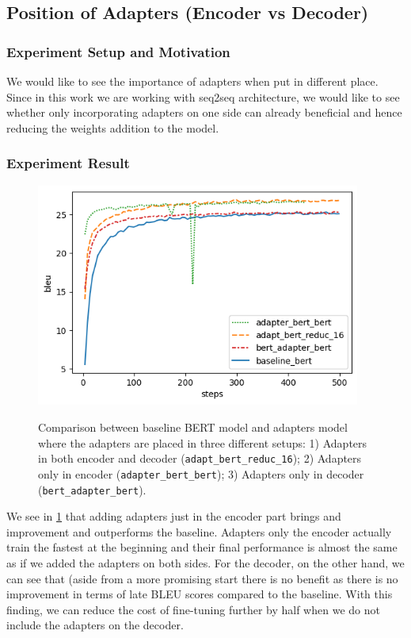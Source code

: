\subsection{Position of Adapters (Encoder vs Decoder)}
\label{sec:posada}
\subsubsection{Experiment Setup and Motivation}
We would like to see the importance of adapters when put in different place. Since in this work we are working with seq2seq architecture, we would like to see whether only incorporating adapters on one side can already beneficial and hence reducing the weights addition to the model.

\subsubsection{Experiment Result}
\begin{figure}[]
    {\includegraphics[width=0.95\textwidth]{img/bert_pos.png}}
    \centering
    \caption[Results of ablation study for adapters in the encoder or the decoder.]{Comparison between baseline BERT model and adapters model where the adapters are placed in three different setups: 1) Adapters in both encoder and decoder (\texttt{adapt\_bert\_reduc\_16}); 2) Adapters only in encoder (\texttt{adapter\_bert\_bert}); 3) Adapters only in decoder (\texttt{bert\_adapter\_bert}).}
    \label{img:adapt_bert_pos}
\end{figure}
We see in \cref{img:adapt_bert_pos} that adding adapters just in the encoder part brings and improvement and outperforms the baseline. Adapters only the encoder actually train the fastest at the beginning and their final performance is almost the same as if we added the adapters on both sides. For the decoder, on the other hand, we can see that (aside from a more promising start there is no benefit as there is no improvement in terms of late BLEU scores compared to the baseline. With this finding, we can reduce the cost of fine-tuning further by half when we do not include the adapters on the decoder.

